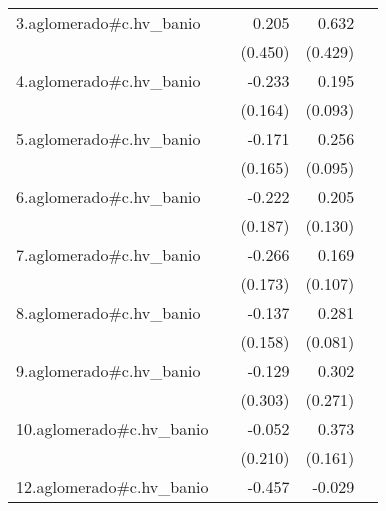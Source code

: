 {\begin{longtable}{l*{4}{D{.}{.}{-1}}}
\addlinespace
3.aglomerado#c.hv\_banio&                     &       0.205         &       0.632         &                     \\
            &                     &     (0.450)         &     (0.429)         &                     \\
\addlinespace
4.aglomerado#c.hv\_banio&                     &      -0.233         &       0.195\sym{*}  &                     \\
            &                     &     (0.164)         &     (0.093)         &                     \\
\addlinespace
5.aglomerado#c.hv\_banio&                     &      -0.171         &       0.256\sym{**} &                     \\
            &                     &     (0.165)         &     (0.095)         &                     \\
\addlinespace
6.aglomerado#c.hv\_banio&                     &      -0.222         &       0.205         &                     \\
            &                     &     (0.187)         &     (0.130)         &                     \\
\addlinespace
7.aglomerado#c.hv\_banio&                     &      -0.266         &       0.169         &                     \\
            &                     &     (0.173)         &     (0.107)         &                     \\
\addlinespace
8.aglomerado#c.hv\_banio&                     &      -0.137         &       0.281\sym{***}&                     \\
            &                     &     (0.158)         &     (0.081)         &                     \\
\addlinespace
9.aglomerado#c.hv\_banio&                     &      -0.129         &       0.302         &                     \\
            &                     &     (0.303)         &     (0.271)         &                     \\
\addlinespace
10.aglomerado#c.hv\_banio&                     &      -0.052         &       0.373\sym{*}  &                     \\
            &                     &     (0.210)         &     (0.161)         &                     \\
\addlinespace
12.aglomerado#c.hv\_banio&                     &      -0.457\sym{*}  &      -0.029         &                     \\

\end{longtable}}
